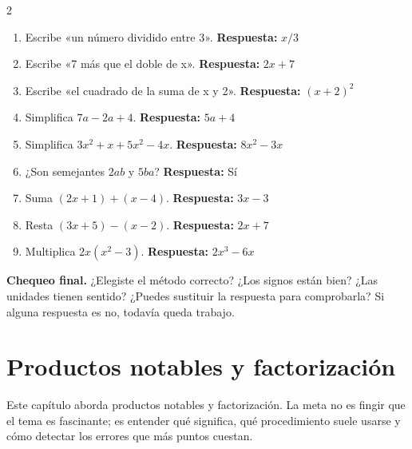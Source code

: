 \documentclass[10pt,oneside,openany]{book}
\begin{document}
\begin{multicols}{2}\begin{enumerate}

\item Escribe «un número dividido entre 3». \textbf{Respuesta:} $x/3$

\item Escribe «7 más que el doble de x». \textbf{Respuesta:} $2x+7$

\item Escribe «el cuadrado de la suma de x y 2». \textbf{Respuesta:} $(x+2)^2$

\item Simplifica $7a-2a+4$. \textbf{Respuesta:} $5a+4$

\item Simplifica $3x^2+x+5x^2-4x$. \textbf{Respuesta:} $8x^2-3x$

\item ¿Son semejantes $2ab$ y $5ba$? \textbf{Respuesta:} Sí

\item Suma $(2x+1)+(x-4)$. \textbf{Respuesta:} $3x-3$

\item Resta $(3x+5)-(x-2)$. \textbf{Respuesta:} $2x+7$

\item Multiplica $2x(x^2-3)$. \textbf{Respuesta:} $2x^3-6x$

\end{enumerate}\end{multicols}

\begin{idea}\textbf{Chequeo final.} ¿Elegiste el método correcto? ¿Los signos están bien? ¿Las unidades tienen sentido? ¿Puedes sustituir la respuesta para comprobarla? Si alguna respuesta es no, todavía queda trabajo.\end{idea}



\chapter{Productos notables y factorización}

\begin{idea}
Este capítulo aborda productos notables y factorización. La meta no es fingir que el tema es fascinante; es entender qué significa, qué procedimiento suele usarse y cómo detectar los errores que más puntos cuestan.
\end{idea}
\end{document}
